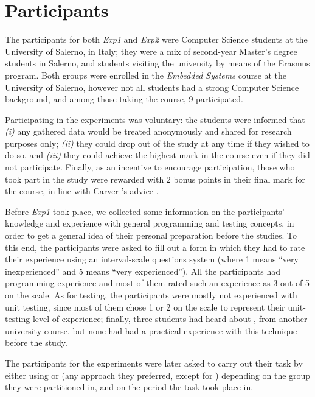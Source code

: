 \section{Participants}
The participants for both \textit{Exp1} and \textit{Exp2} were Computer Science students at the University of Salerno, in Italy; they were a mix of second-year Master's degree students in Salerno, and students visiting the university by means of the Erasmus program. Both groups were enrolled in the \textit{Embedded Systems} course at the University of Salerno, however not all students had a strong Computer Science background, and among those taking the course, 9 participated. 

Participating in the experiments was voluntary: the students were informed that \textit{(i)} any gathered data would be treated anonymously and shared for research purposes only; \textit{(ii)} they could drop out of the study at any time if they wished to do so, and \textit{(iii)} they could achieve the highest mark in the course even if they did not participate. Finally, as an incentive to encourage participation, those who took part in the study were rewarded with 2 bonus points in their final mark for the course, in line with Carver \etal's advice \cite{DBLP:conf/metrics/CarverJMS03}.

Before \textit{Exp1} took place, we collected some information on the participants' knowledge and experience with general programming and testing concepts, in order to get a general idea of their personal preparation before the studies. To this end, the participants were asked to fill out a form in which they had to rate their experience using an interval-scale questions system (where 1 means “very inexperienced” and 5 means “very experienced”). All the participants had programming experience and most of them rated such an experience as 3 out of 5 on the scale. 
As for testing, the participants were mostly not experienced with unit testing, since most of them chose 1 or 2 on the scale to represent their unit-testing level of experience; finally, three students had heard about \tdd, from another university course, but none had had a practical experience with this technique before the study.

The participants for the experiments were later asked to carry out their task by either using \tdd or \notdd (\ie any approach they preferred, except for \tdd) depending on the group they were partitioned in, and on the period the task took place in. 





